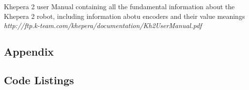 \documentclass[11pt, a4paper]{article}
\begin{document}
\begin{thebibliography}{8}
\par{Khepera 2 user Manual containing all the fundamental information about the Khepera 2 robot, including information abotu encoders and their value meanings} \\
\textit{http://ftp.k-team.com/khepera/documentation/Kh2UserManual.pdf}







\end{thebibliography}


\begin{appendices}
\section*{Appendix}
\subsection{Code Listings}









\end{appendices}
\end{document}
